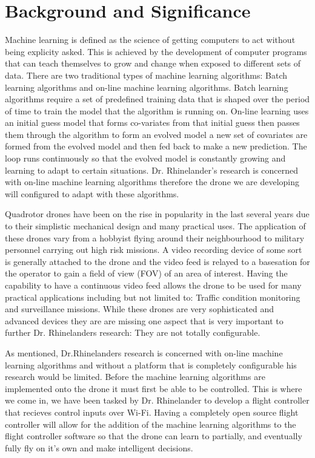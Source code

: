 \section{Background and Significance}
Machine learning is defined as the science of getting computers to act without being explicity asked. This is achieved by the development of computer programs that can teach themselves to grow and change when exposed to different sets of data. There are two traditional types of machine learning algorithms: Batch learning algorithms and on-line machine learning algorithms. Batch learning algorithms require a set of predefined training data that is shaped over the period of time to train the model that the algorithm is running on. On-line learning uses an initial guess model that forms co-variates from that initial guess then passes them through the algorithm to form an evolved model a new set of covariates are formed from the evolved model and then fed back to make a new prediction. The loop runs continuously so that the evolved model is constantly growing and learning to adapt to certain situations. Dr. Rhinelander's research is concerned with on-line machine learning algorithms therefore the drone we are developing will configured to adapt with these algorithms. 

Quadrotor drones have been on the rise in popularity in the last several years due to their simplistic mechanical design and many practical uses. The application of these drones vary from a hobbyist flying around their neighbourhood to military personnel carrying out high risk missions. A video recording device of some sort is generally attached to the drone and the video feed is relayed to a basesation for the operator to gain a field of view (FOV) of an area of interest. Having the capability to have a continuous video feed allows the drone to be used for many practical applications including but not limited to: Traffic condition monitoring and surveillance missions. While these drones are very sophisticated and advanced devices they are are missing one aspect that is very important to further Dr. Rhinelanders research: They are not totally configurable. 

As mentioned, Dr.Rhinelanders research is concerned with on-line machine learning algorithms and without a platform that is completely configurable his research would be limited. Before the machine learning algorithms are implemented onto the drone it must first be able to be controlled. This is where we come in, we have been tasked by Dr. Rhinelander to develop a flight controller that recieves control inputs over Wi-Fi. Having a completely open source flight controller will allow for the addition of the machine learning algorithms to the flight controller software so that the drone can learn to partially, and eventually fully fly on it's own and make intelligent decisions.